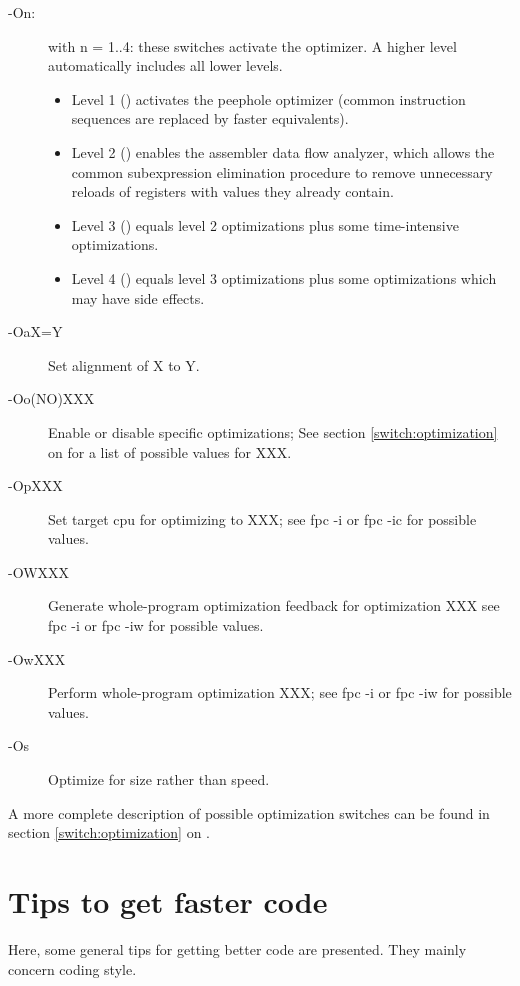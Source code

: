 \begin{description}
\item [-On:\ ] with n = 1..4: these switches activate the optimizer.
A higher level automatically includes all lower levels.
\begin{itemize}
\item Level 1 () activates the peephole optimizer
 (common instruction sequences are replaced by faster equivalents).
\item Level 2 () enables the assembler data flow analyzer,
which allows the common subexpression elimination procedure to
remove unnecessary reloads of registers with values they already contain.
\item Level 3 () equals level 2 optimizations plus some
time-intensive optimizations.
\item Level 4 () equals level 3 optimizations plus some
optimizations which may have side effects.
\end{itemize}
\item[-OaX=Y] Set alignment of X to Y.
\item[-Oo(NO)XXX] Enable or disable specific optimizations; See section \ref{switch:optimization}
on \pageref{switch:optimization} for a list of possible values for XXX.
\item[-OpXXX] Set target cpu for optimizing to XXX; see fpc -i or fpc -ic for possible values.
\item[-OWXXX] Generate whole-program optimization feedback for optimization XXX see fpc -i or fpc -iw for possible values.
\item[-OwXXX] Perform whole-program optimization XXX; see fpc -i or fpc -iw for possible values.
\item[-Os] Optimize for size rather than speed.
\end{description}
A more complete description of possible optimization switches can be found
in section \ref{switch:optimization} on \pageref{switch:optimization}.

\section{Tips to get faster code}
Here, some general tips for getting better code are presented. They
mainly concern coding style.

